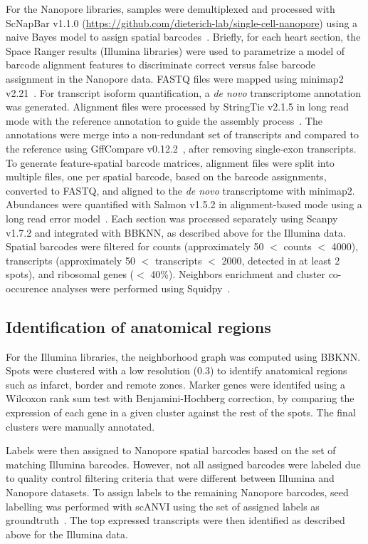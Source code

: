 \documentclass[utf8]{FrontiersinHarvard} %
\newcommand{\denovo}{\textit{de novo}\xspace}
\begin{document}
For the Nanopore libraries, samples were demultiplexed and processed with ScNapBar v1.1.0 (\url{https://github.com/dieterich-lab/single-cell-nanopore}) using a naive Bayes model to assign spatial barcodes~\citep{Wang2021:scnapbar}.
Briefly, for each heart section, the Space Ranger results (Illumina libraries) were used to parametrize a model of barcode alignment features to discriminate correct versus false barcode assignment in the Nanopore data. 
FASTQ files were mapped using minimap2 v2.21~\citep{Heng2018:minimap}. 
For transcript isoform quantification, a \denovo transcriptome annotation was generated. 
Alignment files were processed by StringTie v2.1.5 in long read mode with the reference annotation to guide the assembly process~\citep{Kovaka2019:stringtie_long}. 
The annotations were merge into a non-redundant set of transcripts and compared to the reference using GffCompare v0.12.2~\citep{Pertea2020:gff}, after removing single-exon transcripts. 
To generate feature-spatial barcode matrices, alignment files were split into multiple files, one per spatial barcode, based on the barcode assignments, converted to FASTQ, and aligned to the \denovo transcriptome with minimap2. 
Abundances were quantified with Salmon v1.5.2 in alignment-based mode using a long read error model~\citep{Patro2017:salmon}. 
Each section was processed separately using Scanpy v1.7.2 and integrated with BBKNN, as described above for the Illumina data.
Spatial barcodes were filtered for counts (approximately 50 $<$ counts $<$ 4000), transcripts (approximately 50 $<$ transcripts $<$ 2000, detected in at least 2 spots), and ribosomal genes ($<$ 40\%).
Neighbors enrichment and cluster co-occurence analyses were performed using Squidpy~\citep{Palla202:squidpy}.

\subsection*{Identification of anatomical regions}
For the Illumina libraries, the neighborhood graph was computed using BBKNN. Spots were clustered with a low resolution (0.3) to identify anatomical regions such as infarct, border and remote zones. Marker genes were identifed using a Wilcoxon rank sum test with Benjamini-Hochberg correction, by comparing the expression of each gene in a given cluster against the rest of the spots. The final clusters were manually annotated.

Labels were then assigned to Nanopore spatial barcodes based on the set of matching Illumina barcodes. 
However, not all assigned barcodes were labeled due to quality control filtering criteria that were different between Illumina and Nanopore datasets. 
To assign labels to the remaining Nanopore barcodes, seed labelling was performed with scANVI using the set of assigned labels as groundtruth~\citep{Xu2021:scANVI}.
The top expressed transcripts were then identified as described above for the Illumina data.
\end{document}
